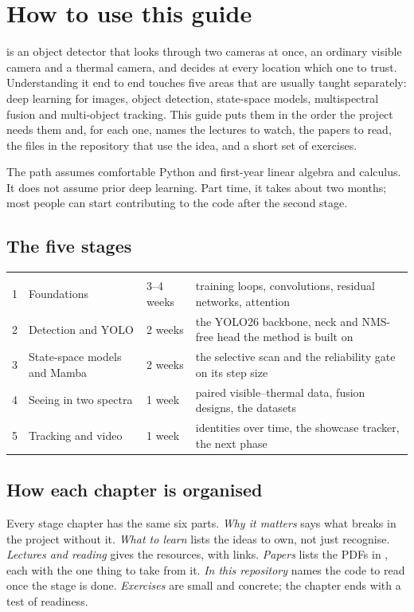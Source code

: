 \chapter{How to use this guide}

\method{} is an object detector that looks through two cameras at once, an ordinary visible camera and a
thermal camera, and decides at every location which one to trust. Understanding it end to end touches five
areas that are usually taught separately: deep learning for images, object detection, state-space models,
multispectral fusion and multi-object tracking. This guide puts them in the order the project needs them and,
for each one, names the lectures to watch, the papers to read, the files in the repository that use the idea,
and a short set of exercises.

The path assumes comfortable Python and first-year linear algebra and calculus. It does not assume prior deep
learning. Part time, it takes about two months; most people can start contributing to the code after the
second stage.

\section{The five stages}

\begin{tabularx}{\textwidth}{@{}P{0.6cm}P{4.2cm}P{1.8cm}L@{}}
\hd{} &  &  &  \\
1 & Foundations & 3--4 weeks & training loops, convolutions, residual networks, attention \\
2 & Detection and YOLO & 2 weeks & the YOLO26 backbone, neck and NMS-free head the method is built on \\
3 & State-space models and Mamba & 2 weeks & the selective scan and the reliability gate on its step size \\
4 & Seeing in two spectra & 1 week & paired visible--thermal data, fusion designs, the datasets \\
5 & Tracking and video & 1 week & identities over time, the showcase tracker, the next phase \\
\end{tabularx}

\section{How each chapter is organised}

Every stage chapter has the same six parts. \emph{Why it matters} says what breaks in the project without it.
\emph{What to learn} lists the ideas to own, not just recognise. \emph{Lectures and reading} gives the
resources, with links. \emph{Papers} lists the PDFs in , each with the one thing to take
from it. \emph{In this repository} names the code to read once the stage is done. \emph{Exercises} are small
and concrete; the chapter ends with a test of readiness.

